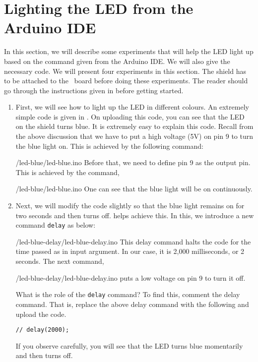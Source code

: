 \section{Lighting the LED from the Arduino IDE}
\label{sec:light-ard}
In this section, we will describe some experiments that will help the
LED light up based on the command given from the Arduino IDE.  We will
also give the necessary code.  We will present four experiments in
this section.  The shield has to be attached to the \arduino\ board
before doing these experiments.  The reader should go through the
instructions given in  before getting started.
\begin{enumerate}
\item First, we will see how to light up the LED in different
colours.  An extremely simple code is given in .
On uploading this code, you can see that the LED on the shield turns
blue.  It is extremely easy to explain this code.  Recall from the
above discussion that we have to put a high voltage (5V) on pin 9 to
turn the blue light on.  This is achieved by the following command:

{\LocLEDardcode/led-blue/led-blue.ino}
Before that, we need to define pin 9 as the
output pin.  This is achieved by the command,

{\LocLEDardcode/led-blue/led-blue.ino}
One can see that the blue light will be on continuously.  

\item Next, we will modify the code slightly so that the blue light
  remains on for two seconds and then turns off.
   helps achieve this.  In this, we
  introduce a new command {\tt delay} as below:
  
  {\LocLEDardcode/led-blue-delay/led-blue-delay.ino} This delay
  command halts the code for the time passed as in input argument. In
  our case, it is 2,000 milliseconds, or 2 seconds.  The next command,
  
  {\LocLEDardcode/led-blue-delay/led-blue-delay.ino} puts a low
  voltage on pin 9 to turn it off.

  What is the role of the {\tt delay} command?  To find this,
  comment the delay command.  That is, replace the above delay command
  with the following and upload the code.
  \begin{lstlisting}[style=nonumbers]
    // delay(2000);
  \end{lstlisting}
  If you observe carefully, you will see that the LED turns blue
  momentarily and then turns off.
 

\end{enumerate}
